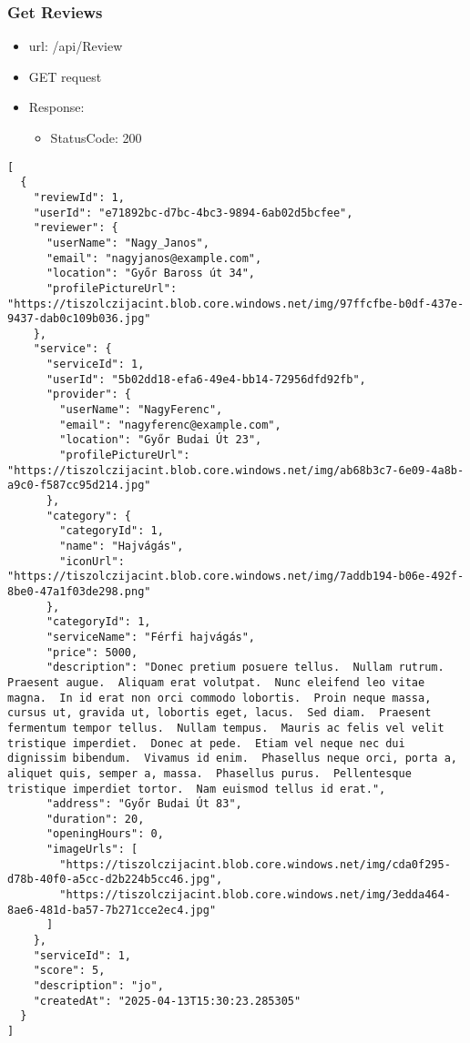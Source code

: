 \documentclass[11pt]{article}
\begin{document}
\subsubsection{Get Reviews}
\label{sec:org22cb2dd}
\begin{itemize}
\item url: /api/Review
\item GET request
\item Response:
\begin{itemize}
\item StatusCode: 200
\end{itemize}
\end{itemize}
\begin{verbatim}
[
  {
    "reviewId": 1,
    "userId": "e71892bc-d7bc-4bc3-9894-6ab02d5bcfee",
    "reviewer": {
      "userName": "Nagy_Janos",
      "email": "nagyjanos@example.com",
      "location": "Győr Baross út 34",
      "profilePictureUrl": "https://tiszolczijacint.blob.core.windows.net/img/97ffcfbe-b0df-437e-9437-dab0c109b036.jpg"
    },
    "service": {
      "serviceId": 1,
      "userId": "5b02dd18-efa6-49e4-bb14-72956dfd92fb",
      "provider": {
        "userName": "NagyFerenc",
        "email": "nagyferenc@example.com",
        "location": "Győr Budai Út 23",
        "profilePictureUrl": "https://tiszolczijacint.blob.core.windows.net/img/ab68b3c7-6e09-4a8b-a9c0-f587cc95d214.jpg"
      },
      "category": {
        "categoryId": 1,
        "name": "Hajvágás",
        "iconUrl": "https://tiszolczijacint.blob.core.windows.net/img/7addb194-b06e-492f-8be0-47a1f03de298.png"
      },
      "categoryId": 1,
      "serviceName": "Férfi hajvágás",
      "price": 5000,
      "description": "Donec pretium posuere tellus.  Nullam rutrum.  Praesent augue.  Aliquam erat volutpat.  Nunc eleifend leo vitae magna.  In id erat non orci commodo lobortis.  Proin neque massa, cursus ut, gravida ut, lobortis eget, lacus.  Sed diam.  Praesent fermentum tempor tellus.  Nullam tempus.  Mauris ac felis vel velit tristique imperdiet.  Donec at pede.  Etiam vel neque nec dui dignissim bibendum.  Vivamus id enim.  Phasellus neque orci, porta a, aliquet quis, semper a, massa.  Phasellus purus.  Pellentesque tristique imperdiet tortor.  Nam euismod tellus id erat.",
      "address": "Győr Budai Út 83",
      "duration": 20,
      "openingHours": 0,
      "imageUrls": [
        "https://tiszolczijacint.blob.core.windows.net/img/cda0f295-d78b-40f0-a5cc-d2b224b5cc46.jpg",
        "https://tiszolczijacint.blob.core.windows.net/img/3edda464-8ae6-481d-ba57-7b271cce2ec4.jpg"
      ]
    },
    "serviceId": 1,
    "score": 5,
    "description": "jo",
    "createdAt": "2025-04-13T15:30:23.285305"
  }
]
\end{verbatim}
\end{document}
